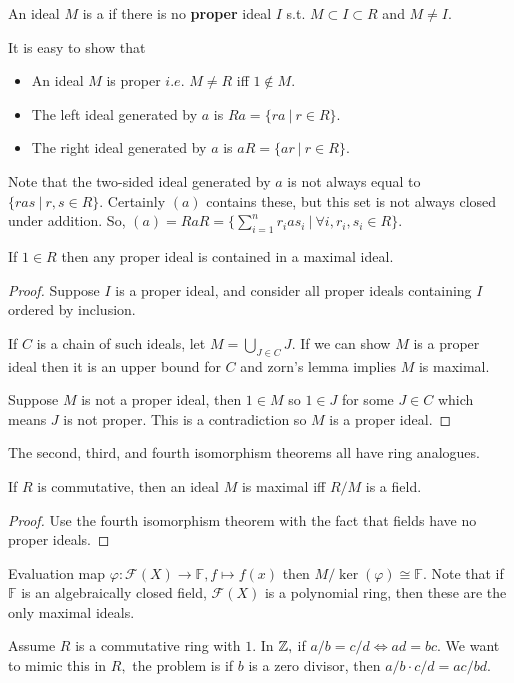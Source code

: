 \documentclass[a4paper]{article}
\begin{document}
\begin{definition}
    An ideal $M$ is a  if there is no \textbf{proper} ideal $I$ s.t. $M\subset I\subset R$ and $M\neq I.$
\end{definition}
It is easy to show that \begin{itemize}
    \item An ideal $M$ is proper $i.e.$ $M\neq R$ iff $1\notin M.$
    \item The left ideal generated by $a$ is $Ra=\{ra~|~r\in R\}.$
    \item The right ideal generated by $a$ is $aR=\{ar~|~r\in R\}.$
\end{itemize}
Note that the two-sided ideal generated by $a$ is not always equal to $\{ras~|~r,s\in R\}.$ Certainly $(a)$ contains these, but this set is not always closed under addition. So, $(a)=RaR=\{\sum_{i=1}^n r_ias_i~|~\forall i,r_i,s_i\in R\}.$
\begin{proposition}
    If $1\in R$ then any proper ideal is contained in a maximal ideal.
    \begin{proof}
        Suppose $I$ is a proper ideal, and consider all proper ideals containing $I$ ordered by inclusion.

        If $C$ is a chain of such ideals, let $M=\bigcup_{J\in C}J.$ If we can show $M$ is a proper ideal then it is an upper bound for $C$ and zorn's lemma implies $M$ is maximal.

        Suppose $M$ is not a proper ideal, then $1\in M$ so $1\in J$ for some $J\in C$ which means $J$ is not proper. This is a contradiction so $M$ is a proper ideal.
    \end{proof}
\end{proposition}
The second, third, and fourth isomorphism theorems all have ring analogues.
\begin{proposition}
    If $R$ is commutative, then an ideal $M$ is maximal iff $R/M$ is a field.
    \begin{proof}
        Use the fourth isomorphism theorem with the fact that fields have no proper ideals.
    \end{proof}
\end{proposition}
\begin{example}
    Evaluation map $\varphi:\mathcal{F}(X)\to\mathbb F,f\mapsto f(x)$ then $M/\ker(\varphi)\cong\mathbb F.$ Note that if $\mathbb F$ is an algebraically closed field, $\mathcal{F}(X)$ is a polynomial ring, then these are the only maximal ideals.
\end{example}
Assume $R$ is a commutative ring with $1.$ In $\mathbb{Z},$ if $a/b=c/d\iff ad=bc.$ We want to mimic this in $R,$ the problem is if $b$ is a zero divisor, then $a/b\cdot c/d=ac/bd.$
\end{document}
